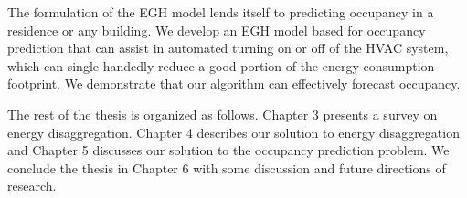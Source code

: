 The formulation of the EGH model lends itself to predicting occupancy in a residence or any building. We develop an EGH model based for occupancy prediction that can assist in automated turning on or off of the HVAC system, which can single-handedly reduce a good portion of the energy consumption footprint. We demonstrate that our algorithm can effectively forecast occupancy. 

The rest of the thesis is organized as follows. Chapter 3 presents a survey on energy disaggregation. Chapter 4 describes our solution to energy disaggregation and Chapter 5 discusses our solution to the occupancy prediction problem. We conclude the thesis in Chapter 6 with some discussion and future directions of research.  




